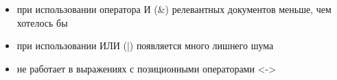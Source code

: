 \begin{frame}
  \begin{itemize}[leftmargin=1em,itemsep=0.7em, label=\RNDSmarkerGray]
    \item при использовании оператора И (\&) релевантных документов меньше, чем хотелось бы
    \item при использовании ИЛИ (|) появляется много лишнего шума
    \item не работает в выражениях с позиционными операторами <->
  \end{itemize}
\end{frame}
